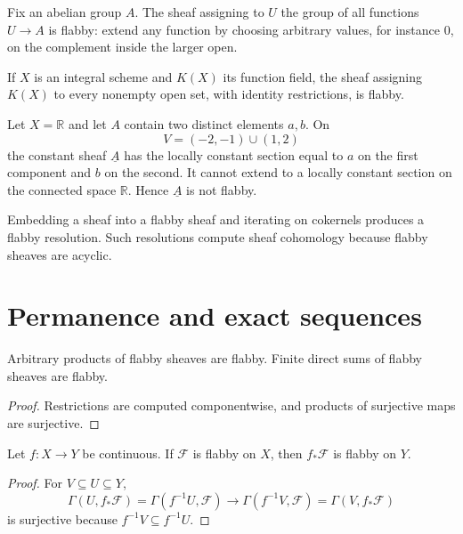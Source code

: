 \begin{example}\label{ex:vi46-all-functions}
Fix an abelian group $A$. The sheaf assigning to $U$ the group of all functions $U\to A$ is flabby: extend any function by choosing arbitrary values, for instance $0$, on the complement inside the larger open.
\end{example}

\begin{example}\label{ex:vi46-rational}
If $X$ is an integral scheme and $K(X)$ its function field, the sheaf assigning $K(X)$ to every nonempty open set, with identity restrictions, is flabby.
\end{example}

\begin{example}\label{ex:vi46-constant-not}
Let $X=\mathbb R$ and let $A$ contain two distinct elements $a,b$. On
\[
V=(-2,-1)\cup(1,2)
\]
the constant sheaf $\underline A$ has the locally constant section equal to $a$ on the first component and $b$ on the second. It cannot extend to a locally constant section on the connected space $\mathbb R$. Hence $\underline A$ is not flabby.
\end{example}

\begin{example}\label{ex:vi46-expand-03}
Embedding a sheaf into a flabby sheaf and iterating on cokernels produces a flabby resolution.  Such resolutions compute sheaf cohomology because flabby sheaves are acyclic.
\end{example}
\section{Permanence and exact sequences}
\begin{proposition}\label{prop:vi46-product}
Arbitrary products of flabby sheaves are flabby. Finite direct sums of flabby sheaves are flabby.
\begin{proof}
Restrictions are computed componentwise, and products of surjective maps are surjective.
\end{proof}
\end{proposition}

\begin{proposition}\label{prop:vi46-pushforward}
Let $f:X\to Y$ be continuous. If $\mathcal F$ is flabby on $X$, then $f_*\mathcal F$ is flabby on $Y$.
\begin{proof}
For $V\subseteq U\subseteq Y$,
\[
\Gamma(U,f_*\mathcal F)=\Gamma(f^{-1}U,\mathcal F)
\longrightarrow
\Gamma(f^{-1}V,\mathcal F)=\Gamma(V,f_*\mathcal F)
\]
is surjective because $f^{-1}V\subseteq f^{-1}U$.
\end{proof}
\end{proposition}

